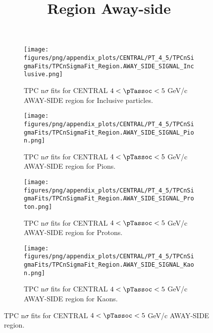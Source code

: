             \begin{figure}[H]
                \title{Region Away-side}
                \begin{subfigure}[b]{0.5\textwidth}
                    \centering
                    \texttt{[image: figures/png/appendix\_plots/CENTRAL/PT\_4\_5/TPCnSigmaFits/TPCnSigmaFit\_Region.AWAY\_SIDE\_SIGNAL\_Inclusive.png]}
                    \caption{TPC n$\sigma$ fits for CENTRAL $4 < \pTassoc < 5$ GeV/c AWAY-SIDE region for Inclusive particles.}
                    \label{fig:appendix_CENTRAL_$4 < \pTassoc < 5$ GeV/c_AWAY_SIDE_SIGNAL_Inclusive}
                \end{subfigure}
                \begin{subfigure}[b]{0.5\textwidth}
                    \centering
                    \texttt{[image: figures/png/appendix\_plots/CENTRAL/PT\_4\_5/TPCnSigmaFits/TPCnSigmaFit\_Region.AWAY\_SIDE\_SIGNAL\_Pion.png]}
                    \caption{TPC n$\sigma$ fits for CENTRAL $4 < \pTassoc < 5$ GeV/c AWAY-SIDE region for Pions.}
                    \label{fig:appendix_CENTRAL_$4 < \pTassoc < 5$ GeV/c_AWAY_SIDE_SIGNAL_Pion}
                \end{subfigure}
                \begin{subfigure}[b]{0.5\textwidth}
                    \centering
                    \texttt{[image: figures/png/appendix\_plots/CENTRAL/PT\_4\_5/TPCnSigmaFits/TPCnSigmaFit\_Region.AWAY\_SIDE\_SIGNAL\_Proton.png]}
                    \caption{TPC n$\sigma$ fits for CENTRAL $4 < \pTassoc < 5$ GeV/c AWAY-SIDE region for Protons.}
                    \label{fig:appendix_CENTRAL_$4 < \pTassoc < 5$ GeV/c_AWAY_SIDE_SIGNAL_Proton}
                \end{subfigure}
                \begin{subfigure}[b]{0.5\textwidth}
                    \centering
                    \texttt{[image: figures/png/appendix\_plots/CENTRAL/PT\_4\_5/TPCnSigmaFits/TPCnSigmaFit\_Region.AWAY\_SIDE\_SIGNAL\_Kaon.png]}
                    \caption{TPC n$\sigma$ fits for CENTRAL $4 < \pTassoc < 5$ GeV/c AWAY-SIDE region for Kaons.}
                    \label{fig:appendix_CENTRAL_$4 < \pTassoc < 5$ GeV/c_AWAY_SIDE_SIGNAL_Kaon}
                \end{subfigure}
                \caption{TPC n$\sigma$ fits for CENTRAL $4 < \pTassoc < 5$ GeV/c AWAY-SIDE region.}
                \label{fig:appendix_CENTRAL_$4 < \pTassoc < 5$ GeV/c_AWAY_SIDE_SIGNAL}
            \end{figure}
